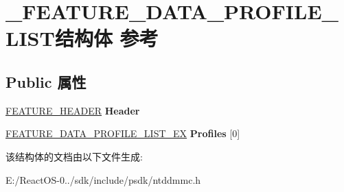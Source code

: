 \hypertarget{struct___f_e_a_t_u_r_e___d_a_t_a___p_r_o_f_i_l_e___l_i_s_t}{}\section{\+\_\+\+F\+E\+A\+T\+U\+R\+E\+\_\+\+D\+A\+T\+A\+\_\+\+P\+R\+O\+F\+I\+L\+E\+\_\+\+L\+I\+S\+T结构体 参考}
\label{struct___f_e_a_t_u_r_e___d_a_t_a___p_r_o_f_i_l_e___l_i_s_t}
\subsection*{Public 属性}
\begin{DoxyCompactItemize}
\item 
\mbox{\label{struct___f_e_a_t_u_r_e___d_a_t_a___p_r_o_f_i_l_e___l_i_s_t_a75fb4715707118cd48756648a820d400}} 
\hyperlink{struct___f_e_a_t_u_r_e___h_e_a_d_e_r}{F\+E\+A\+T\+U\+R\+E\+\_\+\+H\+E\+A\+D\+ER} {\bfseries Header}
\item 
\mbox{\label{struct___f_e_a_t_u_r_e___d_a_t_a___p_r_o_f_i_l_e___l_i_s_t_a664d60d1b587ebfa06b782614fb64cc4}} 
\hyperlink{struct___f_e_a_t_u_r_e___d_a_t_a___p_r_o_f_i_l_e___l_i_s_t___e_x}{F\+E\+A\+T\+U\+R\+E\+\_\+\+D\+A\+T\+A\+\_\+\+P\+R\+O\+F\+I\+L\+E\+\_\+\+L\+I\+S\+T\+\_\+\+EX} {\bfseries Profiles} \mbox{[}0\mbox{]}
\end{DoxyCompactItemize}


该结构体的文档由以下文件生成\+:\begin{DoxyCompactItemize}
\item 
E\+:/\+React\+O\+S-\/0../sdk/include/psdk/ntddmmc.\+h\end{DoxyCompactItemize}
